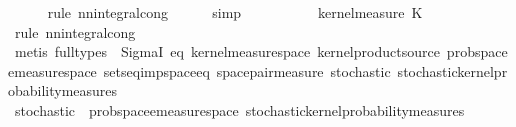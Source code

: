 \begin{isabellebody}
\ \ \ \ \isamarkupfalse%
\ {\isacharparenleft}{\kern0pt}rule\ nn{\isacharunderscore}{\kern0pt}integral{\isacharunderscore}{\kern0pt}cong{\isacharparenright}{\kern0pt}\isanewline
\ \ \ \ \isamarkupfalse%
\ simp\isanewline
\ \ \isamarkupfalse%
\ \isamarkupfalse%
\ {\isachardoublequoteopen}{\isachardot}{\kern0pt}{\isachardot}{\kern0pt}{\isachardot}{\kern0pt}\ {\isacharequal}{\kern0pt}\ {\isasymintegral}\isactrlsup {\isacharplus}{\kern0pt}\ {\isasymomega}\ {}\ {\isasympartial}kernel{\isacharunderscore}{\kern0pt}measure\ K{\isacharunderscore}{\kern0pt}{}\ {\isasymomega}{\isachardoublequoteclose}\isanewline
\ \ \ \ \isamarkupfalse%
\ {\isacharparenleft}{\kern0pt}rule\ nn{\isacharunderscore}{\kern0pt}integral{\isacharunderscore}{\kern0pt}cong{\isacharparenright}{\kern0pt}\isanewline
\ \ \ \ \isamarkupfalse%
\ {\isacharparenleft}{\kern0pt}metis\ {\isacharparenleft}{\kern0pt}full{\isacharunderscore}{\kern0pt}types{\isacharparenright}{\kern0pt}\ {\isachardoublequoteopen}{\isacharasterisk}{\kern0pt}{\isachardoublequoteclose}\ SigmaI\ eq\ kernel{\isacharunderscore}{\kern0pt}measure{\isacharunderscore}{\kern0pt}space\ kernel{\isacharunderscore}{\kern0pt}product{\isacharunderscore}{\kern0pt}source\ prob{\isacharunderscore}{\kern0pt}space{\isachardot}{\kern0pt}emeasure{\isacharunderscore}{\kern0pt}space{\isacharunderscore}{\kern0pt}{}\ sets{\isacharunderscore}{\kern0pt}eq{\isacharunderscore}{\kern0pt}imp{\isacharunderscore}{\kern0pt}space{\isacharunderscore}{\kern0pt}eq\ space{\isacharunderscore}{\kern0pt}pair{\isacharunderscore}{\kern0pt}measure\ stochastic{\isacharparenleft}{\kern0pt}{}{\isacharparenright}{\kern0pt}\ stochastic{\isacharunderscore}{\kern0pt}kernel{\isachardot}{\kern0pt}probability{\isacharunderscore}{\kern0pt}measures{\isacharparenright}{\kern0pt}\isanewline
\ \ \isamarkupfalse%
\ \isamarkupfalse%
\ {\isachardoublequoteopen}{\isachardot}{\kern0pt}{\isachardot}{\kern0pt}{\isachardot}{\kern0pt}\ {\isacharequal}{\kern0pt}\ {}{\isachardoublequoteclose}\isanewline
\ \ \ \ \isamarkupfalse%
\ stochastic{\isacharparenleft}{\kern0pt}{}{\isacharparenright}{\kern0pt}\ {\isacharasterisk}{\kern0pt}\ prob{\isacharunderscore}{\kern0pt}space{\isachardot}{\kern0pt}emeasure{\isacharunderscore}{\kern0pt}space{\isacharunderscore}{\kern0pt}{}\ stochastic{\isacharunderscore}{\kern0pt}kernel{\isachardot}{\kern0pt}probability{\isacharunderscore}{\kern0pt}measures\ \isamarkupfalse%

\end{isabellebody}
